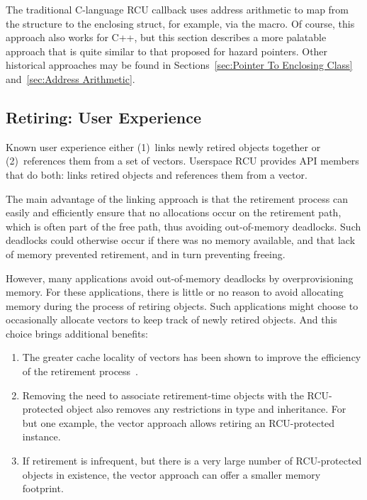 \documentclass[letterpaper,10pt]{article}
\begin{document}
The traditional C-language RCU callback uses address arithmetic
to map from the  structure to the enclosing struct,
for example, via the  macro.
Of course, this approach also works for C++, but this section describes
a more palatable approach that is quite similar to that proposed for
hazard pointers.
Other historical approaches may be found in
Sections~\ref{sec:Pointer To Enclosing Class}
and~\ref{sec:Address Arithmetic}.

\subsection{Retiring: User Experience}
\label{sec:Retiring: User Experience}

Known user experience either (1)~links newly retired
objects together or (2)~references them from a set of vectors.
Userspace RCU provides API members that do both:  
links retired objects and  references them from a
vector.

The main advantage of the linking approach is that the retirement
process can easily and efficiently ensure that no allocations occur on
the retirement path, which is often part of the free path, thus avoiding
out-of-memory deadlocks.
Such deadlocks could otherwise occur if there was no memory available,
and that lack of memory prevented retirement, and in turn preventing freeing.

However, many applications avoid out-of-memory deadlocks by overprovisioning
memory.
For these applications, there is little or no reason to avoid allocating
memory during the process of retiring objects.
Such applications might choose to occasionally allocate vectors to
keep track of newly retired objects.
And this choice brings additional benefits:

\begin{enumerate}
\item	The greater cache locality of vectors has been shown to
	improve the efficiency of the retirement
	process~\cite{MathieuDesnoyers2012URCU}.
\item	Removing the need to associate retirement-time objects with
	the RCU-protected object also removes any restrictions in
	type and inheritance.
	For but one example, the vector approach allows retiring an
	RCU-protected  instance.
\item	If retirement is infrequent, but there is a very large number
	of RCU-protected objects in existence, the vector approach
	can offer a smaller memory footprint.
\end{enumerate}
\end{document}
